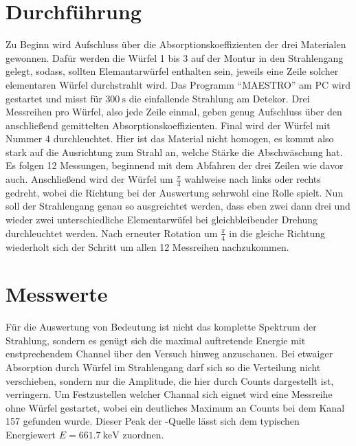 \section{Durchführung}
Zu Beginn wird Aufschluss über die Absorptionskoeffizienten der drei Materialen gewonnen. 
Dafür werden die Würfel 1 bis 3 auf der Montur in den Strahlengang gelegt, sodass, sollten Elemantarwürfel enthalten sein, jeweils eine Zeile solcher elementaren Würfel 
durchstrahlt wird. Das Programm  \enquote{MAESTRO} am PC wird gestartet und misst für $\SI{300}{\second}$ die einfallende Strahlung am Detekor. Drei Messreihen pro Würfel, also jede Zeile einmal, geben genug Aufschluss über den anschließend gemittelten Absorptionskoeffizienten.
Final wird der Würfel mit Nummer 4 durchleuchtet. Hier ist das Material nicht homogen, es kommt also stark auf die Ausrichtung zum Strahl an, welche Stärke
die Abschwäschung hat. Es folgen 12 Messungen, beginnend mit dem Abfahren der drei Zeilen wie davor auch. Anschließend wird der Würfel um 
$\frac{\pi}{4}$ wahlweise nach links oder rechts gedreht, wobei die Richtung bei der Auswertung sehrwohl eine Rolle spielt.
Nun soll der Strahlengang genau so ausgreichtet werden, dass eben zwei dann drei und wieder zwei unterschiedliche Elementarwüfel bei gleichbleibender Drehung
durchleuchtet werden. Nach erneuter Rotation um $\frac{\pi}{4}$ in die gleiche Richtung wiederholt sich der Schritt um 
allen 12 Messreihen nachzukommen.

\section{Messwerte}
Für die Auswertung von Bedeutung ist nicht das komplette Spektrum der Strahlung, sondern es genügt sich die maximal auftretende Energie mit enstprechendem
Channel über den Versuch hinweg anzuschauen. Bei etwaiger Absorption durch Würfel im Strahlengang darf sich so die Verteilung nicht verschieben, sondern 
nur die Amplitude, die hier durch Counts dargestellt ist, verringern.
Um Festzustellen welcher Channal sich eignet wird eine Messreihe ohne Würfel gestartet, wobei ein deutliches Maximum an Counts bei dem Kanal 157 gefunden wurde. Dieser Peak der -Quelle lässt sich dem typischen Energiewert
$E = \SI{661.7}{\kilo\electronvolt}$ zuordnen.


